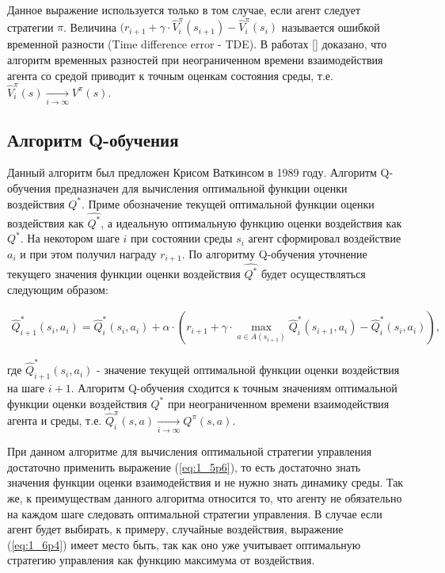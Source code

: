 Данное выражение используется только в том случае, если агент следует стратегии $ \pi $. Величина $ (r_{i+1}+ \gamma\cdot\hat{V}^{\pi}_{i}(s_{i+1})-\hat{V}^{\pi}_{i}(s_{i}) $ называется ошибкой временной разности (Time difference error - TDE). В работах [] доказано, что алгоритм временных разностей при неограниченном времени взаимодействия агента со средой приводит к точным оценкам состояния среды, т.е. $ \hat{V}^{\pi}_{i}(s) \underset{i\rightarrow\infty}\longrightarrow {V}^{\pi}(s) $.


\subsection{Алгоритм Q-обучения} \label{subsect1_6_2}

Данный алгоритм был предложен Крисом Ваткинсом в 1989 году. Алгоритм Q-обучения предназначен для вычисления оптимальной функции оценки воздействия $ Q^* $. Приме обозначение текущей оптимальной функции оценки воздействия как  $ \hat{Q^*} $, а идеальную оптимальную функцию оценки воздействия как $ Q^* $. На некотором шаге $ i $ при состоянии среды $ s_i $ агент сформировал воздействие $ a_i $ и при этом получил награду $ r_{i+1} $. По алгоритму Q-обучения уточнение текущего значения функции оценки воздействия $ \hat{Q^*} $ будет осуществляться следующим образом:

\begin{equation}
\label{eq:1_6p4}
\begin{alignedat}{2}
\hat{Q}^{*}_{i+1}(s_i, a_i) = \hat{Q}^{*}_{i}(s_i, a_i)+\alpha\cdot ( r_{i+1} + \gamma\cdot\displaystyle\max_{a \in A(s_{i+1})}\hat{Q}^{*}_{i}(s_{i+1}, a_i) - \hat{Q}^{*}_{i}(s_{i}, a_i)),
\end{alignedat}
\end{equation}

\noindent где $ \hat{Q}^{*}_{i+1}(s_i, a_i) $ - значение текущей оптимальной функции оценки воздействия на шаге $ i+1 $. Алгоритм Q-обучения сходится к точным значениям оптимальной функции оценки воздействия  $ Q^* $ при неограниченном времени взаимодействия агента и среды, т.е. $ \hat{Q}^{\pi}_{i}(s,a) \underset{i\rightarrow\infty}\longrightarrow {Q}^{\pi}(s,a) $.

При данном алгоритме для вычисления оптимальной стратегии управления достаточно применить выражение (\ref{eq:1_5p6}), то есть достаточно знать значения функции оценки взаимодействия и не нужно знать динамику среды. Так же, к преимуществам данного алгоритма относится то, что агенту не обязательно на каждом шаге следовать оптимальной стратегии управления. В случае если агент будет выбирать, к примеру, случайные воздействия, выражение (\ref{eq:1_6p4}) имеет место быть, так как оно уже учитывает оптимальную стратегию управления как функцию максимума от воздействия.

